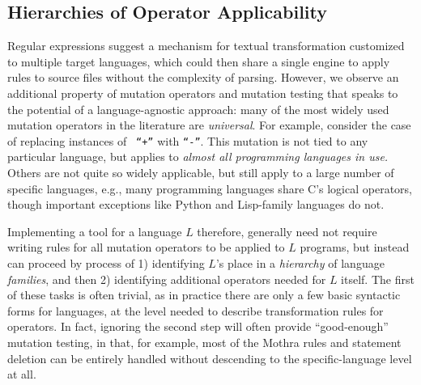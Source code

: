 \documentclass[acmsmall]{acmart}
\begin{document}



\subsection{Hierarchies of Operator Applicability}

Regular expressions suggest a mechanism for textual transformation customized to
multiple target languages, which could then share a single engine to apply rules
to source files without the complexity of parsing. 
However, we observe an additional property of mutation operators and mutation
testing that speaks to the potential of a language-agnostic approach: many of the
most widely used mutation operators in the literature are \emph{universal}.  For
example, consider the case of replacing instances of {\tt
  ``+''}  with {\tt ``-''}.  This mutation is not tied to any
particular language, but applies to \emph{almost all programming
  languages in use.}  Others are not quite
so widely applicable, but still apply to a large number of specific
languages, e.g., many programming languages share C's logical
operators, though important exceptions like Python and Lisp-family
languages do not.

Implementing a tool for a language $L$ therefore, generally need not
require writing rules for all mutation operators to be applied to $L$
programs, but instead can proceed by process of 1) identifying $L$'s
place in a \emph{hierarchy} of language \emph{families}, and then 2)
identifying additional operators needed for $L$ itself.  The first of
these tasks is often trivial, as in practice there are only a few
basic syntactic forms for languages, at the level needed to describe
transformation rules for operators.  In fact, ignoring the second step
will often provide ``good-enough'' mutation testing, in that, for
example, most of the Mothra rules and statement deletion can be
entirely handled without descending to the specific-language level at all.
\end{document}
